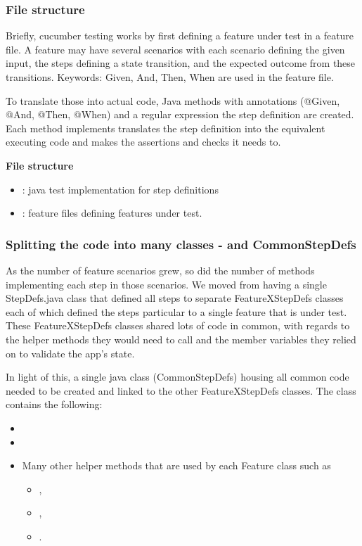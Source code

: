 \subsubsection{File structure}

Briefly, cucumber testing works by first defining a feature under test in a feature file. A feature may have several scenarios with each scenario defining the given input, the steps defining a state transition, and the expected outcome from these transitions. Keywords: Given, And, Then, When are used in the feature file. 
\par
To translate those into actual code, Java methods with annotations (@Given, @And, @Then, @When) and a regular expression the step definition are created. Each method implements translates the step definition into the equivalent executing code and makes the assertions and checks it needs to. 
\par
\textbf{File structure}
\begin{itemize}
    \item {}: java test implementation for step definitions 
    \item {}: feature files defining features under test. 
\end{itemize}

\subsubsection{Splitting the code into many classes - and CommonStepDefs}
As the number of feature scenarios grew, so did the number of methods implementing each step in those scenarios. 
We moved from having a single StepDefs.java class that defined all steps to separate FeatureXStepDefs classes each of which defined the steps particular to a single feature that is under test.
These FeatureXStepDefs classes shared lots of code in common, with regards to the helper methods they would need to call and the member variables they relied on to validate the app's state. 
\par
In light of this, a single java class (CommonStepDefs) housing all common code needed to be created and linked to the other FeatureXStepDefs classes. The class contains the following: 

\begin{itemize}
    \item {}
    \item {}
    \item Many other helper methods that are used by each Feature class such as 
    \begin{itemize}
        \item {}, 
        \item {}, 
        \item {}.
    \end{itemize}
\end{itemize}


